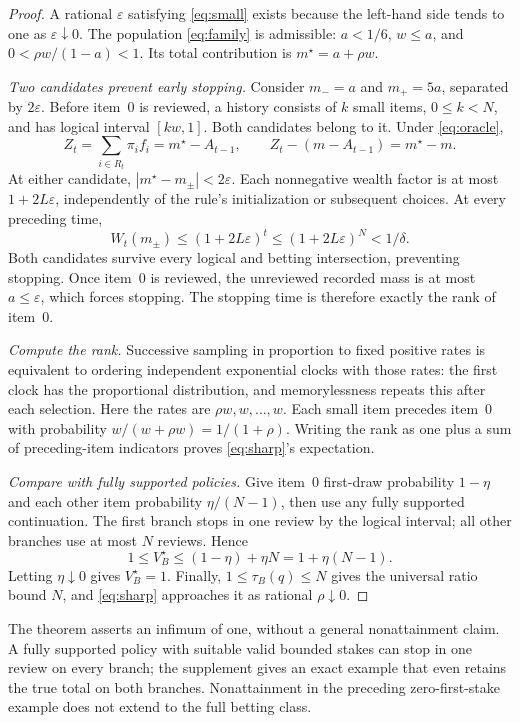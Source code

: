 \documentclass[11pt]{article}
\begin{document}
\begin{proof}
A rational $\varepsilon$ satisfying \eqref{eq:small} exists because the
left-hand side tends to one as $\varepsilon\downarrow0$. The population
\eqref{eq:family} is admissible: $a<1/6$, $w\le a$, and
$0<\rho w/(1-a)<1$. Its total contribution is $m^\star=a+\rho w$.

\emph{Two candidates prevent early stopping.}
Consider $m_-=a$ and $m_+=5a$, separated by $2\varepsilon$.
Before item~0 is reviewed, a history consists of $k$ small items,
$0\le k<N$, and has logical interval $[kw,1]$. Both candidates belong to
it. Under \eqref{eq:oracle},
\[
 Z_t=\sum_{i\in R_t}\pi_i f_i=m^\star-A_{t-1},\qquad
 Z_t-(m-A_{t-1})=m^\star-m.
\]
At either candidate, $|m^\star-m_\pm|<2\varepsilon$. Each nonnegative
wealth factor is at most $1+2L\varepsilon$, independently of the rule's
initialization or subsequent choices. At every preceding time,
\begin{equation}\label{eq:witness}
 W_t(m_\pm)\le(1+2L\varepsilon)^t
 \le(1+2L\varepsilon)^N<1/\delta.
\end{equation}
Both candidates survive every logical and betting intersection, preventing
stopping. Once item~0 is reviewed, the unreviewed recorded mass is at most
$a\le\varepsilon$, which forces stopping. The stopping time is therefore
exactly the rank of item~0.

\emph{Compute the rank.}
Successive sampling in proportion to fixed positive rates is equivalent to
ordering independent exponential clocks with those rates: the first clock
has the proportional distribution, and memorylessness repeats this after each
selection. Here the rates are $\rho w,w,\ldots,w$. Each small item precedes
item~0 with probability $w/(w+\rho w)=1/(1+\rho)$. Writing the rank as one
plus a sum of preceding-item indicators proves \eqref{eq:sharp}'s expectation.

\emph{Compare with fully supported policies.}
Give item~0 first-draw probability $1-\eta$ and each other item probability
$\eta/(N-1)$, then use any fully supported continuation. The first branch
stops in one review by the logical interval; all other branches use at most
$N$ reviews. Hence
\[
 1\le V_B^\star\le(1-\eta)+\eta N=1+\eta(N-1).
\]
Letting $\eta\downarrow0$ gives $V_B^\star=1$. Finally,
$1\le\tau_B(q)\le N$ gives the universal ratio bound $N$, and
\eqref{eq:sharp} approaches it as rational $\rho\downarrow0$.
\end{proof}

The theorem asserts an infimum of one, without a general nonattainment claim.
A fully supported policy with suitable valid bounded stakes can stop in one
review on every branch; the supplement gives an exact example that even
retains the true total on both branches. Nonattainment in the preceding
zero-first-stake example does not extend to the full betting class.
\end{document}
